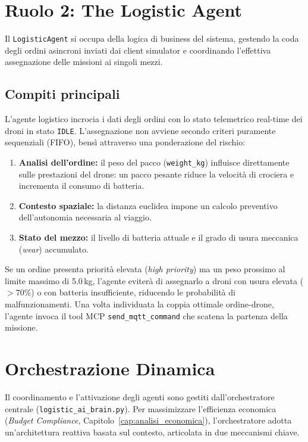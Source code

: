\section{Ruolo 2: The Logistic Agent}
\label{sec:logistic_agent}

Il \texttt{LogisticAgent} si occupa della logica di business del sistema, gestendo la coda degli ordini asincroni inviati dai client simulator e coordinando l'effettiva assegnazione delle missioni ai singoli mezzi.

\subsection*{Compiti principali}

L'agente logistico incrocia i dati degli ordini con lo stato telemetrico real-time dei droni in stato \texttt{IDLE}. L'assegnazione non avviene secondo criteri puramente sequenziali (FIFO), bensì attraverso una ponderazione del rischio:

\begin{enumerate}
    \item \textbf{Analisi dell'ordine:} il peso del pacco (\texttt{weight\_kg}) influisce direttamente sulle prestazioni del drone: un pacco pesante riduce la velocità di crociera e incrementa il consumo di batteria.
    \item \textbf{Contesto spaziale:} la distanza euclidea impone un calcolo preventivo dell'autonomia necessaria al viaggio.
    \item \textbf{Stato del mezzo:} il livello di batteria attuale e il grado di usura meccanica (\textit{wear}) accumulato.
\end{enumerate}

Se un ordine presenta priorità elevata (\textit{high priority}) ma un peso prossimo al limite massimo di 5.0\,kg, l'agente eviterà di assegnarlo a droni con usura elevata ($>70\%$) o con batteria insufficiente, riducendo le probabilità di malfunzionamenti. Una volta individuata la coppia ottimale ordine-drone, l'agente invoca il tool MCP \texttt{send\_mqtt\_command} che scatena la partenza della missione.

\section{Orchestrazione Dinamica}
\label{sec:logistic_ai_brain}

Il coordinamento e l'attivazione degli agenti sono gestiti dall'orchestratore centrale (\texttt{logistic\_ai\_brain.py}). Per massimizzare l'efficienza economica (\textit{Budget Compliance}, Capitolo~\ref{cap:analisi_economica}), l'orchestratore adotta un'architettura reattiva basata sul contesto, articolata in due meccanismi chiave.

